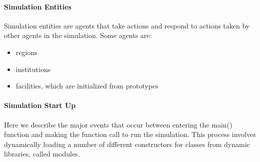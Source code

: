 \documentclass[letterpaper,10pt,english]{sphinxmanual}
\begin{document}
\paragraph{Simulation Entities}
\label{devdoc/sim_init:simulation-entities}
Simulation entities are agents that take actions and respond to actions
taken by other agents in the simulation. Some agents are:
\begin{itemize}
\item {} 
regions

\item {} 
institutions

\item {} 
facilities, which are initialized from prototypes

\end{itemize}


\paragraph{Simulation Start Up}
\label{devdoc/sim_init:simulation-start-up}
Here we describe the major events that occur between entering the
main() function and making the function call to run the simulation.
This process involves dynamically loading a number of different
constructors for classes from dynamic libraries, called modules.
\end{document}

